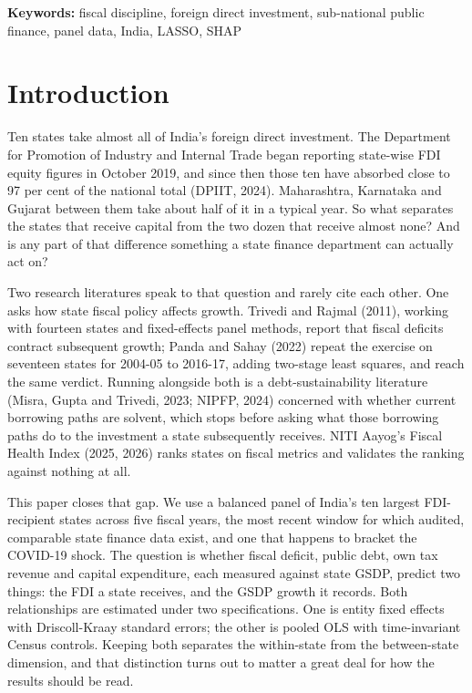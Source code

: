 \documentclass[12pt,a4paper]{article}
\begin{document}
\medskip
\noindent\textbf{Keywords:} fiscal discipline, foreign direct investment, sub-national public finance, panel data, India, LASSO, SHAP

\FloatBarrier
\section{Introduction}

Ten states take almost all of India's foreign direct investment. The Department for Promotion of Industry and Internal Trade began reporting state-wise FDI equity figures in October 2019, and since then those ten have absorbed close to 97 per cent of the national total (DPIIT, 2024). Maharashtra, Karnataka and Gujarat between them take about half of it in a typical year. So what separates the states that receive capital from the two dozen that receive almost none? And is any part of that difference something a state finance department can actually act on?

Two research literatures speak to that question and rarely cite each other. One asks how state fiscal policy affects growth. Trivedi and Rajmal (2011), working with fourteen states and fixed-effects panel methods, report that fiscal deficits contract subsequent growth; Panda and Sahay (2022) repeat the exercise on seventeen states for 2004-05 to 2016-17, adding two-stage least squares, and reach the same verdict. Running alongside both is a debt-sustainability literature (Misra, Gupta and Trivedi, 2023; NIPFP, 2024) concerned with whether current borrowing paths are solvent, which stops before asking what those borrowing paths do to the investment a state subsequently receives. NITI Aayog's Fiscal Health Index (2025, 2026) ranks states on fiscal metrics and validates the ranking against nothing at all.

This paper closes that gap. We use a balanced panel of India's ten largest FDI-recipient states across five fiscal years, the most recent window for which audited, comparable state finance data exist, and one that happens to bracket the COVID-19 shock. The question is whether fiscal deficit, public debt, own tax revenue and capital expenditure, each measured against state GSDP, predict two things: the FDI a state receives, and the GSDP growth it records. Both relationships are estimated under two specifications. One is entity fixed effects with Driscoll-Kraay standard errors; the other is pooled OLS with time-invariant Census controls. Keeping both separates the within-state from the between-state dimension, and that distinction turns out to matter a great deal for how the results should be read.
\end{document}

